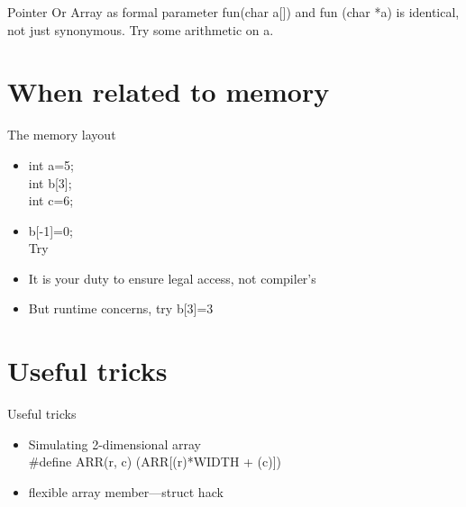 \documentclass{beamer}
\begin{document}
\begin{frame}{Pointer Or Array as formal parameter}
fun(char a[]) and fun (char *a) is identical, not just synonymous.
Try some arithmetic on a.
\end{frame}


\section{When related to memory}

\begin{frame}{The memory layout}
  \begin{itemize}
    \item <1-> 
    int a=5;\\
    int b[3];\\
    int c=6; 
    \item <2-> b[-1]=0;\\Try
    \item <3-> It is your duty to ensure legal access, not compiler's  
    \item <4-> But runtime concerns, try b[3]=3
  \end{itemize}

\end{frame}



\section{Useful tricks}
\begin{frame}{Useful tricks}
  \begin{itemize}
  \item Simulating 2-dimensional array\\ \#define ARR(r, c) (ARR[(r)*WIDTH + (c)])
  \item flexible array member---struct hack
  \end{itemize}
\end{frame}
\end{document}
